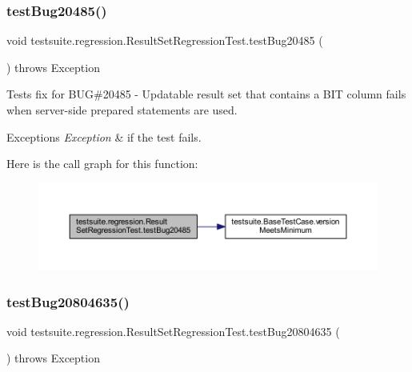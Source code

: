 \subsubsection{\texorpdfstring{test\+Bug20485()}{testBug20485()}}
{\footnotesize\ttfamily void testsuite.\+regression.\+Result\+Set\+Regression\+Test.\+test\+Bug20485 (\begin{DoxyParamCaption}{ }\end{DoxyParamCaption}) throws Exception}

Tests fix for B\+UG\#20485 -\/ Updatable result set that contains a B\+IT column fails when server-\/side prepared statements are used.


\begin{DoxyExceptions}{Exceptions}
{\em Exception} & if the test fails. \\
\hline
\end{DoxyExceptions}
Here is the call graph for this function\+:
\nopagebreak
\begin{figure}[H]
\begin{center}
\leavevmode
\includegraphics[width=350pt]{classtestsuite_1_1regression_1_1_result_set_regression_test_a5e674e0b217a2731be3be70fa79f0007_cgraph}
\end{center}
\end{figure}
\mbox{\label{classtestsuite_1_1regression_1_1_result_set_regression_test_a73eb842a830acedbf8af195858dfc58f}} 
\subsubsection{\texorpdfstring{test\+Bug20804635()}{testBug20804635()}}
{\footnotesize\ttfamily void testsuite.\+regression.\+Result\+Set\+Regression\+Test.\+test\+Bug20804635 (\begin{DoxyParamCaption}{ }\end{DoxyParamCaption}) throws Exception}

